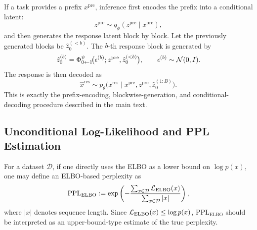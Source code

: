 If a task provides a prefix $x^{\mathrm{pre}}$, inference first encodes the prefix into a conditional latent:
\begin{equation}
z^{\mathrm{pre}}\sim q_{\phi}(z^{\mathrm{pre}}\mid x^{\mathrm{pre}}),
\label{eq:app_prefix_encode}
\end{equation}
and then generates the response latent block by block. Let the previously generated blocks be $\hat z_0^{(<b)}$. The $b$-th response block is generated by
\begin{equation}
\hat z_0^{(b)}
=
\Phi^{\psi}_{0\leftarrow 1}\!\bigl(\epsilon^{(b)};z^{\mathrm{pre}},\hat z_0^{(<b)}\bigr),
\qquad
\epsilon^{(b)}\sim\mathcal{N}(0,I).
\label{eq:app_block_generation}
\end{equation}
The response is then decoded as
\begin{equation}
\hat x^{\mathrm{res}}
\sim
p_{\theta}\!\bigl(x^{\mathrm{res}}\mid x^{\mathrm{pre}},z^{\mathrm{pre}},\hat z_0^{(1:B)}\bigr).
\label{eq:app_conditional_decode}
\end{equation}
This is exactly the prefix-encoding, blockwise-generation, and conditional-decoding procedure described in the main text.

\subsection{Unconditional Log-Likelihood and PPL Estimation}
\label{app:uncond_likelihood}

For a dataset $\mathcal D$, if one directly uses the ELBO as a lower bound on $\log p(x)$, one may define an ELBO-based perplexity as
\begin{equation}
\mathrm{PPL}_{\mathrm{ELBO}}
:=
\exp\left(
-\frac{\sum_{x\in\mathcal D}\mathcal{L}_{\mathrm{ELBO}}(x)}{\sum_{x\in\mathcal D}|x|}
\right),
\label{eq:app_ppl_elbo}
\end{equation}
where $|x|$ denotes sequence length. Since $\mathcal{L}_{\mathrm{ELBO}}(x)\le \log p(x)$, $\mathrm{PPL}_{\mathrm{ELBO}}$ should be interpreted as an upper-bound-type estimate of the true perplexity.

